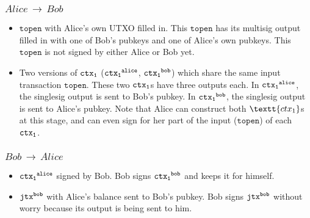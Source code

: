\subsubsection{$Alice\,\to\,Bob$}
\begin{itemize}[leftmargin=4\parindent]
    \item $\texttt{topen}$ with Alice's own UTXO filled in. This $\texttt{topen}$ has its multisig output filled in with one of Bob's pubkeys and one of Alice's own pubkeys. This $\texttt{topen}$ is not signed by either Alice or Bob yet.
    \item Two versions of $\texttt{ctx\textsubscript{1}}$ ($\texttt{ctx\textsubscript{1}\textsuperscript{alice}}$, $\texttt{ctx\textsubscript{1}\textsuperscript{bob}}$) which share the same input transaction $\texttt{topen}$. These two $\texttt{ctx\textsubscript{1}}$s have three outputs each. In $\texttt{ctx\textsubscript{1}\textsuperscript{alice}}$, the  singlesig output is sent to Bob's pubkey. In $\texttt{ctx\textsubscript{1}\textsuperscript{bob}}$, the  singlesig output is sent to Alice's pubkey. Note that Alice can construct both $\textt{ctx\textsubscript{1}}$s at this stage, and can even sign for her part of the input ($\texttt{topen}$) of each $\texttt{ctx\textsubscript{1}}$.
\end{itemize}
\subsubsection{$Bob\,\to\,Alice$}
\begin{itemize}[leftmargin=4\parindent]
    \item $\texttt{ctx\textsubscript{1}\textsuperscript{alice}}$ signed by Bob. Bob signs $\texttt{ctx\textsubscript{1}\textsuperscript{bob}}$ and keeps it for himself.
    \item $\texttt{jtx\textsuperscript{bob}}$ with Alice's balance sent to Bob's pubkey. Bob signs $\texttt{jtx\textsuperscript{bob}}$ without worry because its output is being sent to him.
\end{itemize}
